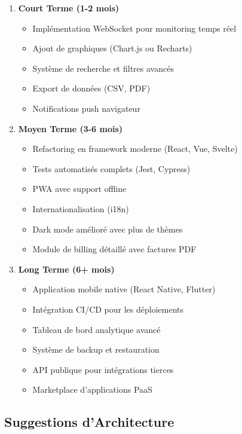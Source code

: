 \documentclass[12pt,a4paper]{article}
\begin{document}
\begin{successbox}
\begin{enumerate}
    \item \textbf{Court Terme (1-2 mois)}
    \begin{itemize}
        \item Implémentation WebSocket pour monitoring temps réel
        \item Ajout de graphiques (Chart.js ou Recharts)
        \item Système de recherche et filtres avancés
        \item Export de données (CSV, PDF)
        \item Notifications push navigateur
    \end{itemize}
    
    \item \textbf{Moyen Terme (3-6 mois)}
    \begin{itemize}
        \item Refactoring en framework moderne (React, Vue, Svelte)
        \item Tests automatisés complets (Jest, Cypress)
        \item PWA avec support offline
        \item Internationalisation (i18n)
        \item Dark mode amélioré avec plus de thèmes
        \item Module de billing détaillé avec factures PDF
    \end{itemize}
    
    \item \textbf{Long Terme (6+ mois)}
    \begin{itemize}
        \item Application mobile native (React Native, Flutter)
        \item Intégration CI/CD pour les déploiements
        \item Tableau de bord analytique avancé
        \item Système de backup et restauration
        \item API publique pour intégrations tierces
        \item Marketplace d'applications PaaS
    \end{itemize}
\end{enumerate}
\end{successbox}

\subsection{Suggestions d'Architecture}
\end{document}
